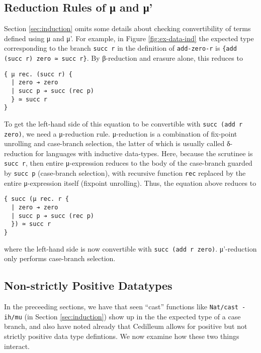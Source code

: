 \documentclass{article}
\begin{document}
\subsection{Reduction Rules of μ and μ'}
Section \ref{sec:induction} omits some details about checking convertibility of
terms defined using μ and μ'. For example, in Figure \ref{fig:ex-data-ind} the expected type
corresponding to the branch \texttt{succ r} in the definition of
\texttt{add-zero-r} is \texttt{\{add (succ r) zero ≃ succ r\}}. By
β-reduction and erasure alone, this reduces to
\begin{verbatim}
{ μ rec. (succ r) {
  | zero ➔ zero
  | succ p ➔ succ (rec p)
  } ≃ succ r
}
\end{verbatim}

To get the left-hand side of this equation to be convertible with \texttt{succ
(add r zero)}, we need a μ-reduction rule. μ-reduction is a combination of
fix-point unrolling and case-branch selection, the latter of which is usually
called δ-reduction for languages with inductive data-types. Here, because the
scrutinee is \texttt{succ r}, then entire μ-expression reduces to the body of
the case-branch guarded by \texttt{succ p} (case-branch selection), with
recursive function \texttt{rec} replaced by the entire μ-expression itself
(fixpoint unrolling). Thus, the equation above reduces to
\begin{verbatim}
{ succ (μ rec. r {
  | zero ➔ zero
  | succ p ➔ succ (rec p)
  }) ≃ succ r
}
\end{verbatim}

\noindent where the left-hand side is now convertible with \texttt{succ (add r
  zero)}. μ'-reduction only performs case-branch selection.

\subsection{Non-strictly Positive Datatypes}
\label{sec:positive-data}
In the preceeding sections, we have that seen ``cast'' functions like
\texttt{Nat/cast -ih/mu} (in Section \ref{sec:induction}) show up in the the expected
type of a case branch, and also have noted already that Cedilleum allows for
positive but not strictly positive data type defintions. We now examine
how these two things interact.
\end{document}
